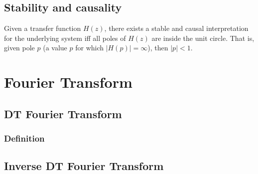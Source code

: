 \documentclass[8pt,a4paper]{scrartcl}
\begin{document}
\begin{multicols*}{3}


\subsection{Stability and causality}

Given a transfer function $H(z)$, there exists a stable and causal interpretation for the underlying system iff all poles of $H(z)$ are inside the unit circle. That is, given pole $p$ (a value $p$ for which $|H(p)|=\infty$), then $|p|<1$.

\section{Fourier Transform}

\subsection{DT Fourier Transform}


\subsubsection{Definition}





\subsection{Inverse DT Fourier Transform}


\end{multicols*}
\end{document}
